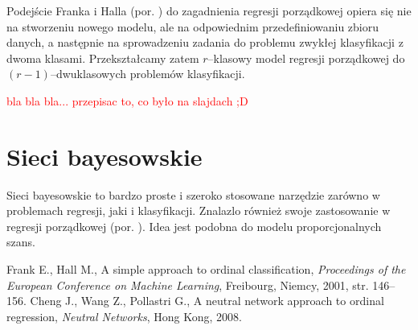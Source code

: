 \documentclass{mini}
\begin{document}
Podejście Franka i Halla (por. \cite{fh}) do zagadnienia regresji porządkowej opiera się nie na stworzeniu nowego modelu, ale na odpowiednim przedefiniowaniu zbioru danych, a następnie na sprowadzeniu zadania do problemu zwykłej klasyfikacji z dwoma klasami. Przekształcamy zatem $r$--klasowy model regresji porządkowej do $(r-1)$--dwuklasowych problemów klasyfikacji.

\textcolor{red}{bla bla bla... przepisac to, co było na slajdach ;D}

\section{Sieci bayesowskie}

Sieci bayesowskie to bardzo proste i szeroko stosowane narzędzie zarówno w problemach regresji, jaki i klasyfikacji. Znalazlo również swoje zastosowanie w regresji porządkowej (por. \cite{nna}). Idea jest podobna do modelu proporcjonalnych szans.


\begin{thebibliography}{9}
	 Frank E., Hall M., A simple approach to ordinal classification, \emph{Proceedings of the European Conference on Machine Learning}, Freibourg, Niemcy, 2001, str. 146--156.
	 Cheng J., Wang Z., Pollastri G., A neutral network approach to ordinal regression, \emph{Neutral Networks}, Hong Kong, 2008.
\end{thebibliography}


\makestatement
\end{document}
